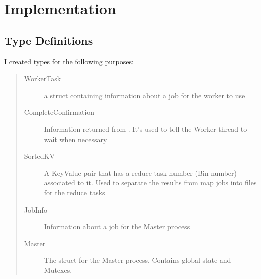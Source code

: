 \documentclass[letterpaper,10pt,english]{sphinxmanual}
\begin{document}
\section{Implementation}
\label{\detokenize{labs/lab2:implementation}}

\subsection{Type Definitions}
\label{\detokenize{labs/lab2:type-definitions}}
I created types for the following purposes:
\begin{quote}\begin{description}
\item[{WorkerTask}] \leavevmode
a struct containing information about a job for the worker
to use

\item[{CompleteConfirmation}] \leavevmode
Information returned from .
It’s used to tell the Worker thread to wait when
necessary

\item[{SortedKV}] \leavevmode
A KeyValue pair that has a reduce task number (Bin number)
associated to it. Used to separate the results from map jobs
into files for the reduce tasks

\item[{JobInfo}] \leavevmode
Information about a job for the Master process

\item[{Master}] \leavevmode
The struct for the Master process. Contains global state
and Mutexes.

\end{description}\end{quote}
\def\sphinxLiteralBlockLabel{\label{\detokenize{labs/lab2:id1}}}
\end{document}
